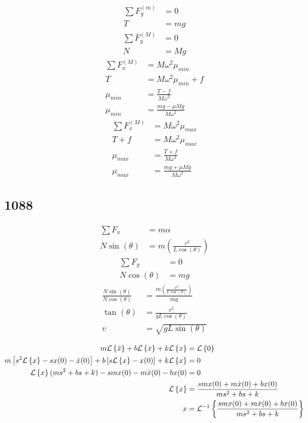 \documentclass{article}
\begin{document}
\begin{align*}
	\sum F_y^{(m)} & = 0 \\
	T & = mg
\end{align*}
\begin{align*}
	\sum F_y^{(M)} & = 0 \\
	N & = Mg
\end{align*}
\begin{align*}
	\sum F_x^{(M)} & = M\omega^2\mu_{min} \\
	T & = M\omega^2\mu_{min} + f \\
	\mu_{min} & = \frac{ T - f }{ M\omega^2 } \\
	\mu_{min} & = \frac{ mg - \mu Mg }{ M\omega^2 }
\end{align*}
\begin{align*}
	\sum F_x^{(M)} & = M\omega^2\mu_{max} \\
	T + f & = M\omega^2\mu_{max} \\
	\mu_{max} & = \frac{ T + f }{ M\omega^2 } \\
	\mu_{max} & = \frac{ mg + \mu Mg }{ M\omega^2 }
\end{align*}

\subsection{1088}

\begin{align*}
	\sum F_x & = m\alpha \\
	N\sin(\theta) & = m \left( \frac{ v^2 }{ L\cos(\theta) } \right)
\end{align*}
\begin{align*}
	\sum F_y & = 0 \\
	N\cos(\theta) & = mg
\end{align*}
\begin{align*}
	\frac{ N\sin(\theta) }{ N \cos(\theta) } & = \frac{ m \left( \frac{ v^2 }{ L\cos(\theta) } \right) }{ mg } \\
	\tan(\theta) & = \frac{ v^2 }{ gL\cos(\theta) } \\
	v & = \sqrt{ gL\sin(\theta) }
\end{align*}

\begin{align*}
	m\lap[\ddot{x}] + b\lap[\dot{x}] + k\lap[x] & = \lap[0] \\
	m \left[ s^2\lap[x] - sx(0) - \dot{x}(0) \right] + b \left[ s\lap[x] - x(0) \right] + k\lap[x] & = 0 \\
	\lap[x](ms^2 + bs + k) - smx(0) - m\dot{x}(0) - bx(0) & = 0 \\
	\lap[x] & = \frac{ smx(0) + m\dot{x}(0) + bx(0) }{ ms^2 + bs + k } \\
	x & = \ilap[ \frac{ smx(0) + m\dot{x}(0) + bx(0) }{ ms^2 + bs + k } ]
\end{align*}
\end{document}
